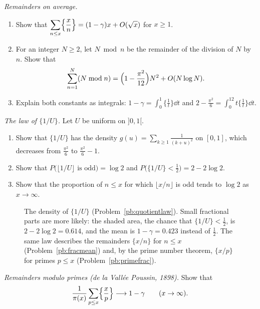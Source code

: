 \begin{exercise}[$\star\star$]\label{pb:fracmean}
\emph{Remainders on average.}
\begin{enumerate}[label=(\alph*)]
\item Show that $\displaystyle\sum_{n\le x}\Bigl\{\frac xn\Bigr\}=(1-\gamma)x+O(\sqrt x)$ for $x\ge1$.
\item For an integer $N\ge2$, let $N\bmod n$ be the remainder of the division of $N$ by $n$. Show that
\[
\sum_{n=1}^N(N\bmod n)=\Bigl(1-\frac{\pi^2}{12}\Bigr)N^2+O(N\log N).
\]
\item Explain both constants as integrals: $1-\gamma=\int_0^1\{\frac1t\}\dd t$ and $2-\frac{\pi^2}6=\int_0^12t\{\frac1t\}\dd t$.
\end{enumerate}
\end{exercise}

\begin{exercise}[$\star\star$]\label{pb:quotientlaw}
\emph{The law of $\{1/U\}$.} Let $U$ be uniform on $]0,1[$.
\begin{enumerate}[label=(\alph*)]
\item Show that $\{1/U\}$ has the density $g(u)=\sum_{k\ge1}\frac1{(k+u)^2}$ on $[0,1]$, which decreases from $\frac{\pi^2}6$ to $\frac{\pi^2}6-1$.
\item Show that $P\bigl(\lfloor1/U\rfloor\text{ is odd}\bigr)=\log2$ and $P\bigl(\{1/U\}<\frac12\bigr)=2-2\log2$.
\item Show that the proportion of $n\le x$ for which $\lfloor x/n\rfloor$ is odd tends to $\log2$ as $x\to\infty$.
\end{enumerate}
\end{exercise}

\begin{figure}[ht]
\centering
{}
\caption{The density of $\{1/U\}$ (Problem~\ref{pb:quotientlaw}). Small fractional parts are more likely: the shaded area, the chance
that $\{1/U\}<\frac12$, is $2-2\log2=0.614$, and the mean is $1-\gamma=0.423$ instead of $\frac12$. The same law describes the
remainders $\{x/n\}$ for $n\le x$ (Problem~\ref{pb:fracmean}) and, by the prime number theorem, $\{x/p\}$ for primes $p\le x$
(Problem~\ref{pb:primefrac}).}
\label{fig:quotient}
\end{figure}

\begin{exercise}[$\star\star\star$]\label{pb:primefrac}
\emph{Remainders modulo primes (de la Vallée Poussin, 1898).} Show that
\[
\frac1{\pi(x)}\sum_{p\le x}\Bigl\{\frac xp\Bigr\}\longrightarrow1-\gamma\qquad(x\to\infty).
\]
\end{exercise}

